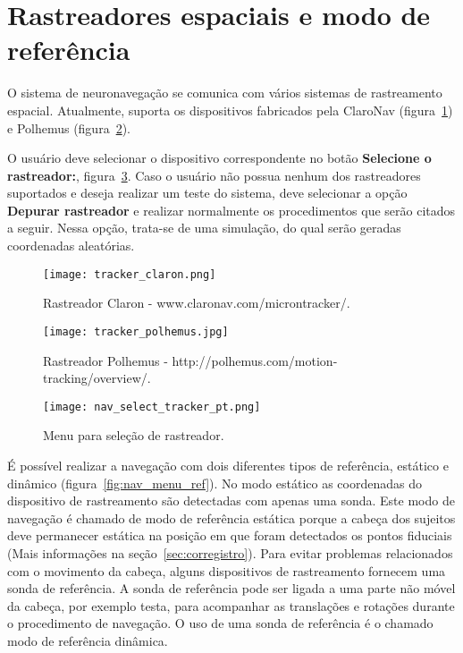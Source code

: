 \section{Rastreadores espaciais e modo de referência}

O sistema de neuronavegação se comunica com vários sistemas de rastreamento espacial. Atualmente, suporta os dispositivos fabricados pela ClaroNav (figura~\ref{fig:tracker_claron}) e Polhemus (figura~\ref{fig:tracker_polhemus}). 

O usuário deve selecionar o dispositivo correspondente no botão \textbf{Selecione o rastreador:}, figura~\ref{fig:nav_select_tracker}.  Caso o usuário não possua nenhum dos rastreadores suportados e deseja realizar um teste do sistema, deve selecionar a opção \textbf{Depurar rastreador} e realizar normalmente os procedimentos que serão citados a seguir. Nessa opção, trata-se de uma simulação, do qual serão geradas coordenadas aleatórias.

\begin{figure}[!htb]
\centering
\texttt{[image: tracker\_claron.png]}
\caption{Rastreador Claron - www.claronav.com/microntracker/.}
\label{fig:tracker_claron}
\end{figure}

\begin{figure}[!htb]
\centering
\texttt{[image: tracker\_polhemus.jpg]}
\caption{Rastreador Polhemus - http://polhemus.com/motion-tracking/overview/.}
\label{fig:tracker_polhemus}
\end{figure}

\begin{figure}[!htb]
\centering
\texttt{[image: nav\_select\_tracker\_pt.png]}
\caption{Menu para seleção de rastreador.}
\label{fig:nav_select_tracker}
\end{figure}

É possível realizar a navegação com dois diferentes tipos de referência, estático e dinâmico (figura~\ref{fig:nav_menu_ref}). No modo estático as coordenadas do dispositivo de rastreamento são detectadas com apenas uma sonda. Este modo de navegação é chamado de modo de referência estática porque a cabeça dos sujeitos deve permanecer estática na posição em que foram detectados os pontos fiduciais (Mais informações na seção~\ref{sec:corregistro}). 
Para evitar problemas relacionados com o movimento da cabeça, alguns dispositivos de rastreamento fornecem uma sonda de referência. A sonda de referência pode ser ligada a uma parte não móvel da cabeça, por exemplo testa, para acompanhar as translações e rotações durante o procedimento de navegação. O uso de uma sonda de referência é o chamado modo de referência dinâmica.

